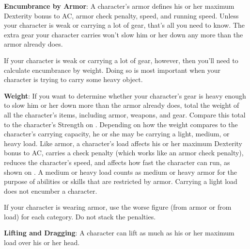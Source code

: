 \textbf{Encumbrance by Armor}: A character's armor defines his or her maximum Dexterity bonus to AC, armor check penalty, speed, and running speed. Unless your character is weak or carrying a lot of gear, that's all you need to know. The extra gear your character carries won't slow him or her down any more than the armor already does.

If your character is weak or carrying a lot of gear, however, then you'll need to calculate encumbrance by weight. Doing so is most important when your character is trying to carry some heavy object.

\textbf{Weight}: If you want to determine whether your character's gear is heavy enough to slow him or her down more than the armor already does, total the weight of all the character's items, including armor, weapons, and gear. Compare this total to the character's Strength on . Depending on how the weight compares to the character's carrying capacity, he or she may be carrying a light, medium, or heavy load. Like armor, a character's load affects his or her maximum Dexterity bonus to AC, carries a check penalty (which works like an armor check penalty), reduces the character's speed, and affects how fast the character can run, as shown on . A medium or heavy load counts as medium or heavy armor for the purpose of abilities or skills that are restricted by armor. Carrying a light load does not encumber a character.

If your character is wearing armor, use the worse figure (from armor or from load) for each category. Do not stack the penalties.


\textbf{Lifting and Dragging}: A character can lift as much as his or her maximum load over his or her head.

